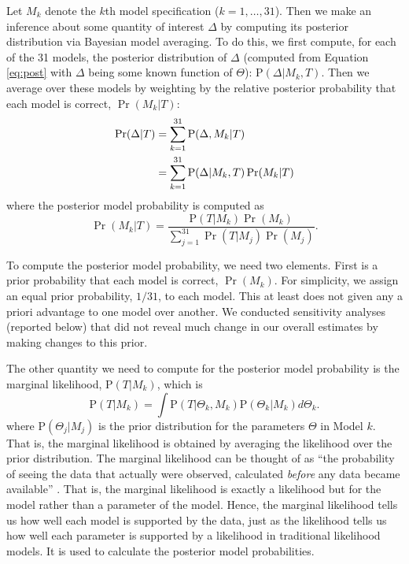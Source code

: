 \documentclass[11pt,titlepage]{article}
\renewcommand{\P}{\text{P}}
\begin{document}
Let $M_k$ denote the $k$th model specification ($k=1,\dots,31$). Then
we make an inference about some quantity of interest $\Delta$ by
computing its posterior distribution via Bayesian model averaging.  To
do this, we first compute, for each of the 31 models, the posterior
distribution of $\Delta$ (computed from Equation \ref{eq:post} with
$\Delta$ being some known function of $\Theta$): $\P(\Delta|M_k,T)$.
Then we average over these models by weighting by the relative
posterior probability that each model is correct, $\Pr(M_k|T)$:
\begin{align} \label{eq:bma}
  \Pr(\Delta|T) &= \sum_{k=1}^{31} \P(\Delta,M_k|T)\notag\\
                &= \sum_{k=1}^{31} \P(\Delta|M_k,T) \Pr(M_k|T)
\end{align}
where the posterior model probability is computed as
\begin{equation}
  \Pr(M_k|T)=\frac{\P(T|M_k)\Pr(M_k)}
             {\sum_{j=1}^{31} \Pr(T|M_j) \Pr(M_j)}.  \label{eq:postmodel}
\end{equation}

To compute the posterior model probability, we need two elements.
First is a prior probability that each model is correct, $\Pr(M_k)$.
For simplicity, we assign an equal prior probability, $1/31$, to each
model.  This at least does not given any a priori advantage to one
model over another.  We conducted sensitivity analyses (reported
below) that did not reveal much change in our overall estimates by
making changes to this prior.

The other quantity we need to compute for the posterior model
probability is the marginal likelihood, $\P(T|M_k)$, which is
\begin{equation}
  \P(T|M_k) = \int \P(T|\Theta_k, M_k) \P(\Theta_k|M_k) d\Theta_k. 
  \label{eq:marglik}
\end{equation} 
where $\P(\Theta_j|M_j)$ is the prior distribution for the parameters
$\Theta$ in Model $k$. That is, the marginal likelihood is obtained by
averaging the likelihood over the prior distribution.  The marginal
likelihood can be thought of as ``the probability of seeing the data
that actually were observed, calculated \emph{before} any data became
available'' \cite[p.776]{kass:raft:95}.  That is, the marginal
likelihood is exactly a likelihood but for the model rather than a
parameter of the model.  Hence, the marginal likelihood tells us how
well each model is supported by the data, just as the likelihood tells
us how well each parameter is supported by a likelihood in traditional
likelihood models.  It is used to calculate the posterior model
probabilities.
\end{document}
